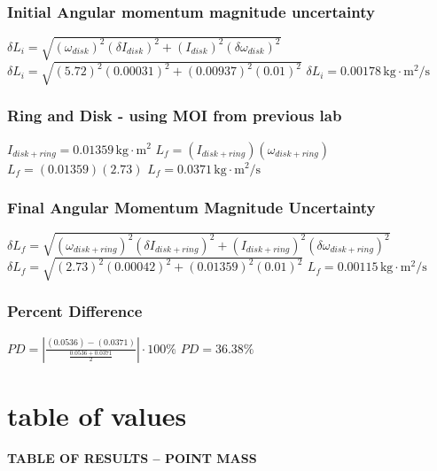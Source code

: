 \documentclass[12pt]{article}
\begin{document}
\subsubsection{Initial Angular momentum magnitude uncertainty}
$\delta L_i = \sqrt{(\omega_{disk})^2(\delta I_{disk})^2+(I_{disk})^2(\delta \omega_{disk})^2}$
\newline 
$\delta L_i = \sqrt{(5.72)^2(0.00031)^2+(0.00937)^2(0.01)^2}$
\newline
$\delta L_i = 0.00178 \, \text{kg} \cdot \text{m}^2 / \text{s}$
\subsubsection{Ring and Disk - using MOI  from previous lab}
$I_{disk + ring} = 0.01359 \, \text{kg} \cdot \text{m}^2$
\newline
$L_f =(I_{disk + ring})(\omega_{disk + ring})$
\newline
$L_f=(0.01359)(2.73)$
\newline
$L_f = 0.0371 \, \text{kg} \cdot \text{m}^2 / \text{s}$
\subsubsection{Final Angular Momentum Magnitude Uncertainty}
$\delta L_f = \sqrt{(\omega_{disk + ring})^2(\delta I_{disk + ring})^2+(I_{disk + ring})^2(\delta \omega_{disk + ring})^2}$
\newline 
$\delta L_f = \sqrt{(2.73)^2(0.00042)^2+(0.01359)^2(0.01)^2}$
\newline 
$L_f = 0.00115 \, \text{kg} \cdot \text{m}^2 / \text{s}$
\subsubsection{Percent Difference}
$PD = \left| \frac{(0.0536)-(0.0371)}{\frac{0.0536+0.0371}{2}}\right| \cdot 100 \%$
\newline 
$PD=36.38\%$
\section{table of values}
\begin{center}
    \textbf{TABLE OF RESULTS -- POINT MASS}
\end{center}
\end{document}
